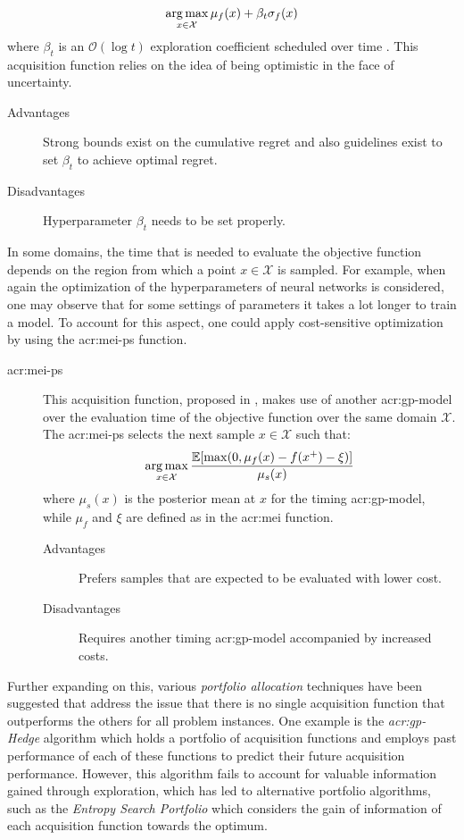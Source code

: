 \begin{description}
	$$\operatorname*{arg\,max}_{x \in \mathcal{X}} \mu_f(x) + \beta_t\sigma_f(x)$$
	where $\beta_t$ is an $\mathcal{O}(\log{t})$ exploration coefficient scheduled over time \cite{perchet2014gaussian}. This acquisition function relies on the idea of being optimistic in the face of uncertainty.
	\begin{description}
		\item[Advantages] Strong bounds exist on the cumulative regret and also guidelines exist to set $\beta_t$ to achieve optimal regret.
		\item[Disadvantages] Hyperparameter $\beta_t$ needs to be set properly.
	\end{description}
\end{description}

In some domains, the time that is needed to evaluate the objective function depends on the region from which a point $x \in \mathcal{X}$ is sampled.
For example, when again the optimization of the hyperparameters of neural networks is considered, one may observe that for some settings of parameters it takes a lot longer to train a model.
To account for this aspect, one could apply cost-sensitive optimization by using the \acrfull{acr:mei-ps} function.
\begin{description}
	\item[\acrfull{acr:mei-ps}] This acquisition function, proposed in \cite{snoek2012practical}, makes use of another \acrshort{acr:gp}-model over the evaluation time of the objective function over the same domain $\mathcal{X}$.
	The \acrshort{acr:mei-ps} selects the next sample $x \in \mathcal{X}$ such that:
	$$\operatorname*{arg\,max}_{x \in \mathcal{X}} \frac{\mathbb{E}[\max(0, \mu_f(x) - f(x^+) - \xi)]}{\mu_s(x)}$$
	where $\mu_s(x)$ is the posterior mean at $x$ for the timing \acrshort{acr:gp}-model, while $\mu_f$ and $\xi$ are defined as in the \acrshort{acr:mei} function.
	\begin{description}
		\item[Advantages] Prefers samples that are expected to be evaluated with lower cost.
		\item[Disadvantages] Requires another timing \acrshort{acr:gp}-model accompanied by increased costs.
	\end{description}
\end{description}

Further expanding on this, various \textit{portfolio allocation} techniques have been suggested that address the issue that there is no single acquisition function that outperforms the others for all problem instances.
One example is the \textit{\acrshort{acr:gp}-Hedge} algorithm \cite{Hoffman2011, shahriari2016taking} which holds a portfolio of acquisition functions and employs past performance of each of these functions to predict their future acquisition performance.
However, this algorithm fails to account for valuable information gained through exploration, which has led to alternative portfolio algorithms, such as the \textit{Entropy Search Portfolio} \cite{shahriari2016taking, wang2016optimization} which considers the gain of information of each acquisition function towards the optimum.

